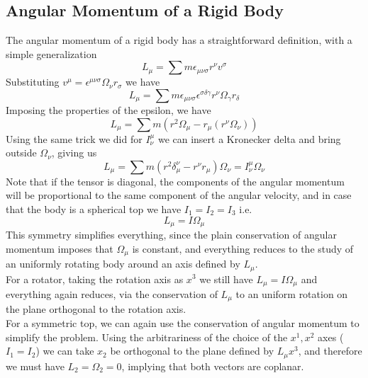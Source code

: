 \documentclass[../admech.tex]{subfiles}
\begin{document}
\subsection{Angular Momentum of a Rigid Body}
The angular momentum of a rigid body has a straightforward definition, with a simple generalization
\begin{equation}
	L_\mu=\sum m\epsilon_{\mu\nu\sigma}r^\nu v^\sigma
	\label{eq:angmomsolid}
\end{equation}
Substituting $v^\mu=\epsilon^{\mu\nu\sigma}\Omega_\nu r_\sigma$ we have
\begin{equation*}
	L_\mu=\sum m\epsilon_{\mu\nu\sigma}\epsilon^{\sigma\delta\gamma}r^\nu\Omega_\gamma r_\delta
\end{equation*}
Imposing the properties of the epsilon, we have
\begin{equation*}
	L_\mu=\sum m\left( r^2\Omega_\mu-r_\mu\left( r^\nu\Omega_\nu \right) \right)
\end{equation*}
Using the same trick we did for $I^\mu_\nu$ we can insert a Kronecker delta and bring outside $\Omega_\nu$, giving us
\begin{equation}
	L_\mu=\sum m\left( r^2\delta^\nu_\mu-r^\nu r_\mu \right)\Omega_\nu=I^\mu_\nu\Omega_\nu
	\label{eq:angmominertia}
\end{equation}
Note that if the tensor is diagonal, the components of the angular momentum will be proportional to the same component of the angular velocity, and in case that the body is a spherical top we have $I_1=I_2=I_3$ i.e.
\begin{equation}
	L_\mu=I\Omega_\mu
	\label{eq:sphericaltopangmom}
\end{equation}
This symmetry simplifies everything, since the plain conservation of angular momentum imposes that $\Omega_\mu$ is constant, and everything reduces to the study of an uniformly rotating body around an axis defined by $L_\mu$.\\
For a rotator, taking the rotation axis as $x^3$ we still have $L_\mu=I\Omega_\mu$ and everything again reduces, via the conservation of $L_\mu$ to an uniform rotation on the plane orthogonal to the rotation axis.\\
For a symmetric top, we can again use the conservation of angular momentum to simplify the problem. Using the arbitrariness of the choice of the $x^1,x^2$ axes ($I_1=I_2$) we can take $x_2$ be orthogonal to the plane defined by $L_\mu x^3$, and therefore we must have $L_2=\Omega_2=0$, implying that both vectors are coplanar.\\
\end{document}

